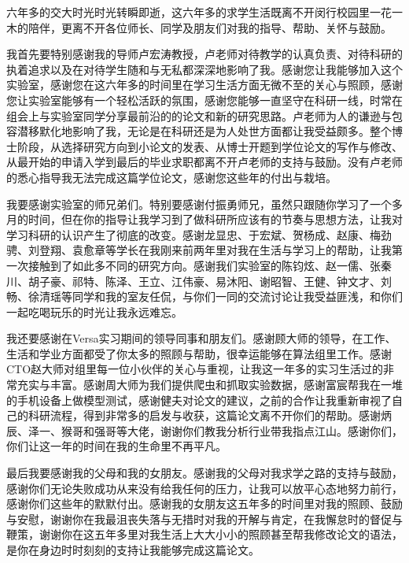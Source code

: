 

\begin{acknowledgements}
  六年多的交大时光时光转瞬即逝，这六年多的求学生活既离不开闵行校园里一花一木的陪伴，更离不开各位师长、同学及朋友们对我的指导、帮助、关怀与鼓励。

  我首先要特别感谢我的导师卢宏涛教授，卢老师对待教学的认真负责、对待科研的执着追求以及在对待学生随和与无私都深深地影响了我。感谢您让我能够加入这个实验室，感谢您在这六年多的时间里在学习生活方面无微不至的关心与照顾，感谢您让实验室能够有一个轻松活跃的氛围，感谢您能够一直坚守在科研一线，时常在组会上与实验室同学分享最前沿的的论文和新的研究思路。卢老师为人的谦逊与包容潜移默化地影响了我，无论是在科研还是为人处世方面都让我受益颇多。整个博士阶段，从选择研究方向到小论文的发表、从博士开题到学位论文的写作与修改、从最开始的申请入学到最后的毕业求职都离不开卢老师的支持与鼓励。没有卢老师的悉心指导我无法完成这篇学位论文，感谢您这些年的付出与栽培。

  我要感谢实验室的师兄弟们。特别要感谢付振勇师兄，虽然只跟随你学习了一个多月的时间，但在你的指导让我学习到了做科研所应该有的节奏与思想方法，让我对学习科研的认识产生了彻底的改变。感谢龙显忠、于宏斌、贺杨成、赵康、梅劲骋、刘登翔、袁愈章等学长在我刚来前两年里对我在生活与学习上的帮助，让我第一次接触到了如此多不同的研究方向。感谢我们实验室的陈钧炫、赵一儒、张秦川、胡子豪、祁特、陈泽、王立、江伟豪、易沐阳、谢昭智、王健、钟文才、刘畅、徐清瑶等同学和我的室友任侃，与你们一同的交流讨论让我受益匪浅，和你们一起吃喝玩乐的时光让我永远难忘。

  我还要感谢在Versa实习期间的领导同事和朋友们。感谢顾大师的领导，在工作、生活和学业方面都受了你太多的照顾与帮助，很幸运能够在算法组里工作。感谢CTO赵大师对组里每一位小伙伴的关心与重视，让我这一年多的实习生活过的非常充实与丰富。感谢周大师为我们提供爬虫和抓取实验数据，感谢富宸帮我在一堆的手机设备上做模型测试，感谢健夫对论文的建议，之前的合作让我重新审视了自己的科研流程，得到非常多的启发与收获，这篇论文离不开你们的帮助。感谢炳辰、泽一、猴哥和强哥等大佬，谢谢你们教我分析行业带我指点江山。感谢你们，你们让这一年的时间在我的生命里不再平凡。

  最后我要感谢我的父母和我的女朋友。感谢我的父母对我求学之路的支持与鼓励，感谢你们无论失败成功从来没有给我任何的压力，让我可以放平心态地努力前行，感谢你们这些年的默默付出。感谢我的女朋友这五年多的时间里对我的照顾、鼓励与安慰，谢谢你在我最沮丧失落与无措时对我的开解与肯定，在我懈怠时的督促与鞭策，谢谢你在这五年多里对我生活上大大小小的照顾甚至帮我修改论文的语法，是你在身边时时刻刻的支持让我能够完成这篇论文。
\end{acknowledgements}

